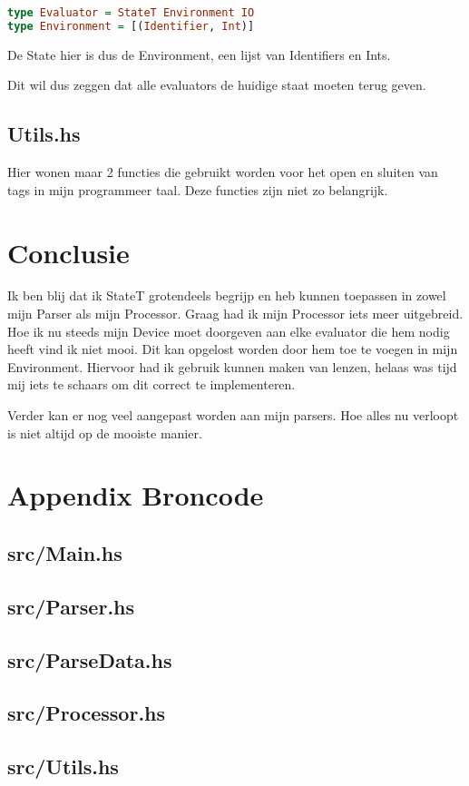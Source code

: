 \documentclass[]{article}
\begin{document}
\begin{lstlisting}[language=Haskell]
type Evaluator = StateT Environment IO
type Environment = [(Identifier, Int)]
\end{lstlisting}

De State hier is dus de Environment, een lijst van Identifiers en Ints. 

Dit wil dus zeggen dat alle evaluators de huidige staat moeten terug geven.

\subsection{Utils.hs}
Hier wonen maar 2 functies die gebruikt worden voor het open en sluiten van tags in mijn programmeer taal. Deze functies zijn niet zo belangrijk.






\section{Conclusie}
Ik ben blij dat ik StateT grotendeels begrijp en heb kunnen toepassen in zowel mijn Parser als mijn Processor. Graag had ik mijn Processor iets meer uitgebreid. Hoe ik nu steeds mijn Device moet doorgeven aan elke evaluator die hem nodig heeft vind ik niet mooi. Dit kan opgelost worden door hem toe te voegen in mijn Environment. Hiervoor had ik gebruik kunnen maken van lenzen, helaas was tijd mij iets te schaars om dit correct te implementeren.

Verder kan er nog veel aangepast worden aan mijn parsers. Hoe alles nu verloopt is niet altijd op de mooiste manier.

\newpage
\section{Appendix Broncode}
\lstset{style=code}
\subsection{src/Main.hs}

\subsection{src/Parser.hs}

\newpage
\subsection{src/ParseData.hs}

\subsection{src/Processor.hs}

\subsection{src/Utils.hs}

\end{document}

